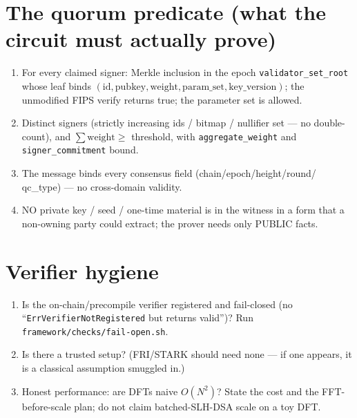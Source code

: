 \documentclass[11pt]{article}
\begin{document}
\section{The quorum predicate (what the circuit must actually prove)}
\begin{enumerate}[leftmargin=*]
  \item For every claimed signer: Merkle inclusion in the epoch
    \texttt{validator\_set\_root} whose leaf binds
    $(\mathrm{id},\mathrm{pubkey},\mathrm{weight},\mathrm{param\_set},
    \mathrm{key\_version})$; the unmodified FIPS verify returns true; the
    parameter set is allowed.
  \item Distinct signers (strictly increasing ids / bitmap / nullifier set ---
    no double-count), and $\sum\mathrm{weight}\ge$ threshold, with
    \texttt{aggregate\_weight} and \texttt{signer\_commitment} bound.
  \item The message binds every consensus field (chain/epoch/height/round/
    qc\_type) --- no cross-domain validity.
  \item NO private key / seed / one-time material is in the witness in a form
    that a non-owning party could extract; the prover needs only PUBLIC facts.
\end{enumerate}

\section{Verifier hygiene}
\begin{enumerate}[leftmargin=*]
  \item Is the on-chain/precompile verifier registered and fail-closed (no
    ``\texttt{ErrVerifierNotRegistered} but returns valid'')? Run
    \texttt{framework/checks/fail-open.sh}.
  \item Is there a trusted setup? (FRI/STARK should need none --- if one
    appears, it is a classical assumption smuggled in.)
  \item Honest performance: are DFTs naive $O(N^2)$? State the cost and the
    FFT-before-scale plan; do not claim batched-SLH-DSA scale on a toy DFT.
\end{enumerate}
\end{document}
